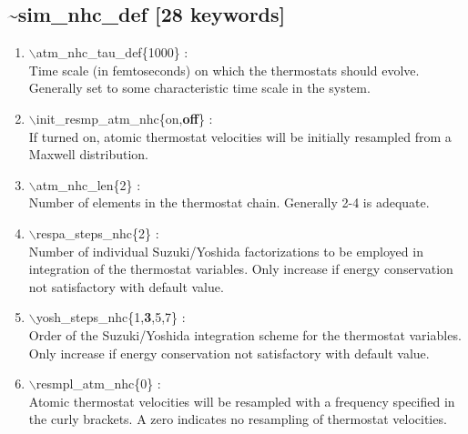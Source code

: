 \documentclass[12pt,titlepage]{article}
\begin{document}
\newpage
\subsection*{\bf \~{}sim\_nhc\_def [28 keywords]}

\begin{enumerate}
 \vspace{0.15in} 
 \item   $\backslash$atm\_nhc\_tau\_def\{1000\} : \\
  Time scale (in femtoseconds) on which the thermostats should evolve. 
  Generally set to some characteristic time scale in the system.

 \vspace{0.15in} 
 \item   $\backslash$init\_resmp\_atm\_nhc\{on,{\bf off}\} : \\
   If turned on, atomic thermostat velocities will be initially resampled from
   a Maxwell distribution.

 \vspace{0.15in} 
 \item   $\backslash$atm\_nhc\_len\{2\} : \\
   Number of elements in the thermostat chain.  Generally 2-4 is adequate.

 \vspace{0.15in}
 \item   $\backslash$respa\_steps\_nhc\{2\} : \\
     Number of individual Suzuki/Yoshida factorizations to be employed in
     integration of the thermostat variables.  Only
     increase if energy conservation not satisfactory with default value.

 \vspace{0.15in}
 \item   $\backslash$yosh\_steps\_nhc\{1,{\bf 3},5,7\} : \\
   Order of the Suzuki/Yoshida integration scheme for the thermostat
   variables.  Only increase if energy conservation not satisfactory with
   default value.

 \vspace{0.15in} 
 \item   $\backslash$resmpl\_atm\_nhc\{0\} : \\
   Atomic thermostat velocities will be resampled with a frequency specified
   in the curly brackets.  A zero indicates no resampling of thermostat
   velocities.


\end{enumerate}
\end{document}
